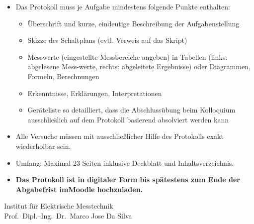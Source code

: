 \documentclass[
parskip,
pagesize=auto,
]{scrbook}
\begin{document}
\vspace{4mm}

{\footnotesize
\singlespacing
\begin{itemize}
	\item Das Protokoll muss je Aufgabe mindestens folgende Punkte enthalten:
	\begin{itemize}
		\item \"Uberschrift und kurze, eindeutige Beschreibung der Aufgabenstellung
		\item Skizze des Schaltplans (evtl. Verweis auf das Skript)
		\item Messwerte (eingestellte Messbereiche angeben) in Tabellen (links: abgelesene Mess-\newline werte, rechts: abgeleitete Ergebnisse) oder Diagrammen, Formeln, Berechnungen
		\item Erkenntnisse, Erkl\"arungen, Interpretationen
		\item Ger\"ateliste so detailliert, dass die Abschluss\"ubung beim Kolloquium ausschlie\"slich \newline auf dem Protokoll basierend absolviert werden kann
	\end{itemize}
	\item Alle Versuche m\"ussen mit ausschlie{\ss}licher Hilfe des Protokolls exakt wiederholbar sein.
    \item Umfang: Maximal 23 Seiten inklusive Deckblatt und Inhaltsverzeichnis.
	\item \textbf{Das Protokoll ist in digitaler Form bis sp\"atestens zum Ende der Abgabefrist im\newline  Moodle hochzuladen.}
\end{itemize}
}

\vspace{10mm}

{\Large Institut f\"ur Elektrische Messtechnik}\\
{Prof.\ Dipl.--Ing.\ Dr.\ Marco Jose Da Silva}\\
\end{document}

